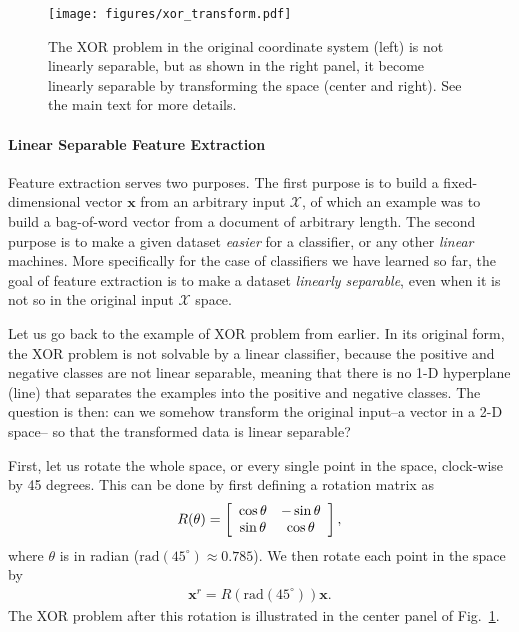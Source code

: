 \documentclass{report}
\newcommand{\vect}[1]{\mathbf{#1}}
\newcommand{\vx}[0]{\vect{x}}
\begin{document}
\begin{figure}
    \centering
    \texttt{[image: figures/xor\_transform.pdf]}

    \caption{
        \label{fig:xor_transformed}
        The XOR problem in the original coordinate system (left) is not linearly
        separable, but as shown in the right panel, it become linearly
        separable by transforming the space (center and right). See the main
        text for more details.
    }
\end{figure}

\paragraph{Linear Separable Feature Extraction}

Feature extraction serves two purposes. The first purpose is to build a
fixed-dimensional vector $\vx$ from an arbitrary input $\mathcal{X}$, of which
an example was to build a bag-of-word vector from a document of arbitrary
length. The second purpose is to make a given dataset {\it easier} for a
classifier, or any other {\it linear} machines. More specifically for the case
of classifiers we have learned so far, the goal of feature extraction is to make
a dataset {\it linearly separable}, even when it is not so in the original input
$\mathcal{X}$ space. 

Let us go back to the example of XOR problem from earlier. In its original form,
the XOR problem is not solvable by a linear classifier, because the positive and
negative classes are not linear separable, meaning that there is no 1-D
hyperplane (line) that separates the examples into the positive and negative
classes. The question is then: can we somehow transform the original input--a
vector in a 2-D space-- so that the transformed data is linear separable?

First, let us rotate the whole space, or every single point in the space,
clock-wise by 45 degrees. This can be done by first defining a rotation matrix
as
\begin{align*}
    R(\theta) = \left[
        \begin{array}{c c}
            \cos \theta & -\sin \theta \\
            \sin \theta & \cos \theta
        \end{array}
    \right],
\end{align*}
where $\theta$ is in radian ($\text{rad}(45^\circ) \approx 0.785$). We then
rotate each point in the space by
\begin{align*}
    \vx^r = R(\text{rad}(45^\circ)) \vx.
\end{align*}
The XOR problem after this rotation is illustrated in the center panel of
Fig.~\ref{fig:xor_transformed}. 
\end{document}
